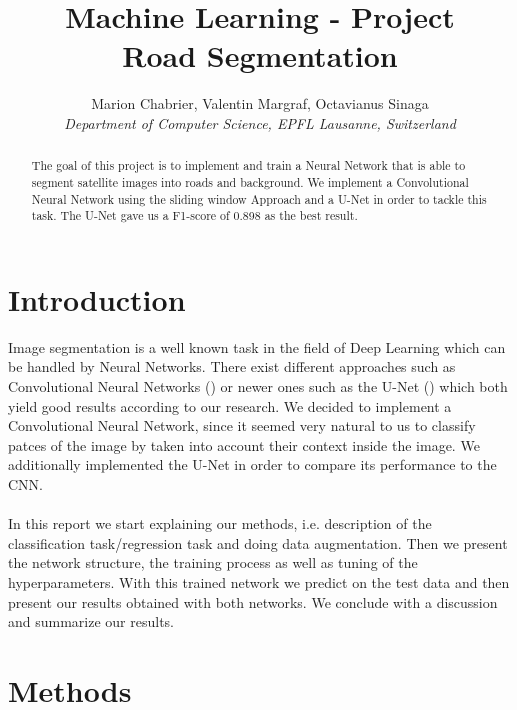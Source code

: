 \documentclass[10pt,conference,compsocconf]{IEEEtran}
\begin{document}
\title{Machine Learning - Project \\ Road Segmentation}

\author{
	Marion Chabrier, Valentin Margraf, Octavianus Sinaga\\
	\textit{Department of Computer Science, EPFL Lausanne, Switzerland}
}

\maketitle

\begin{abstract}
	The goal of this project is to implement and train a Neural Network that is able to segment satellite images into roads and background. We implement a Convolutional Neural Network using the sliding window Approach and a U-Net in order to tackle this task. The U-Net gave us a F1-score of 0.898 as the best result.\end{abstract}

\section{Introduction}
\vspace{0.3cm}
Image segmentation is a well known task in the field of Deep Learning which can be handled by Neural Networks. There exist different approaches such as Convolutional Neural Networks (\cite{pixelwise}) or newer ones such as the U-Net (\cite{unet}) which both yield good results according to our research. We decided to implement a Convolutional Neural Network,  since it seemed very natural to us to classify patces of the image by taken into account their context inside the image. We additionally implemented the U-Net in order to compare its performance to the CNN. 
\\\\In this report we start explaining our methods, i.e. description of the classification task/regression task and doing data augmentation.  Then we present the network structure, the training process as well as tuning of the hyperparameters. With this trained network we predict on the test data and then present our results obtained with both networks. We conclude with a discussion and summarize our results.

\vspace{0.5cm}
\section{Methods}
\vspace{0.3cm}
\end{document}
